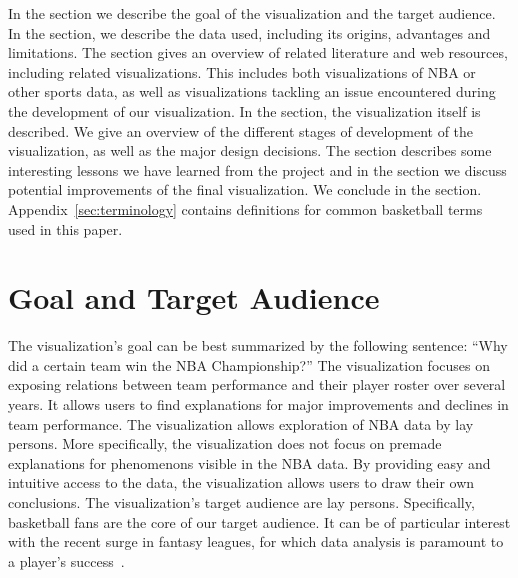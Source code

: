 \documentclass[]{sigchi}
\begin{document}
In the  section we describe the goal of the visualization and the
target audience. In the  section, we describe the data used, including its origins, advantages and limitations. The  section gives an overview of related literature and web resources, including related
visualizations. This includes both visualizations of NBA or other sports data,
as well as visualizations tackling an issue encountered during the development of
our visualization. In the  section, the visualization itself is described. We give an overview of the different stages of development
of the visualization, as well as the major design decisions.
The  section describes some interesting lessons we have learned from the project and in the  section we discuss potential  improvements of the final visualization. We conclude in the  
 section. Appendix~\ref{sec:terminology} contains definitions 
for common basketball terms used in this paper.

\section{Goal and Target Audience}\label{sec:goal} 
The visualization's goal can be best summarized by the following sentence:
``Why did a certain team win the NBA Championship?'' The visualization focuses
on exposing relations between team performance and their player roster over
several years. It allows users to find explanations for major improvements and
declines in team performance.  The visualization allows exploration of NBA data
by lay persons.  More specifically, the visualization does not focus on premade
explanations for phenomenons visible in the NBA data. By providing easy and
intuitive access to the data, the visualization allows users to draw their own
conclusions. The visualization's target audience are lay persons. Specifically,
basketball fans are the core of our target audience. It can be of particular
interest with the recent surge in fantasy leagues, for which data analysis is
paramount to a player's success~\cite{fantasy,fantasyskill}.
\end{document}
